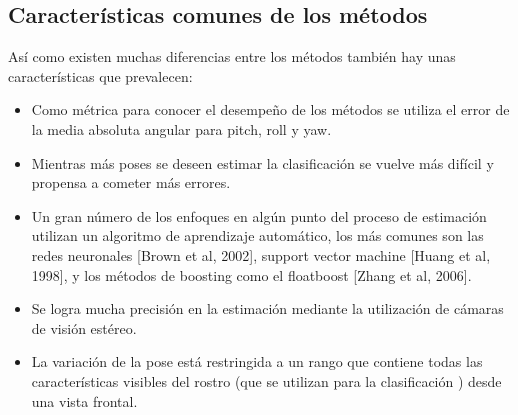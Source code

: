    \subsection{Características comunes de los métodos}
   Así como existen muchas diferencias entre los métodos también hay unas características que prevalecen:
   \begin{itemize}
   	\item Como métrica para conocer el desempeño de los métodos se utiliza el error de la media absoluta angular para pitch, roll y yaw.
   	\item Mientras más poses se deseen estimar la clasificación se vuelve más difícil y propensa a cometer más errores.
   	\item Un gran número de los enfoques en algún punto del proceso de estimación utilizan un algoritmo de aprendizaje automático, los más comunes son las redes neuronales [Brown et al, 2002], support vector machine [Huang et al, 1998], y los métodos de boosting como el floatboost [Zhang et al, 2006].
   	\item Se logra mucha precisión en la estimación mediante la utilización de cámaras de visión estéreo.
   	\item La variación de la pose está restringida a un rango que contiene todas las características visibles del rostro (que se utilizan para la clasificación ) desde una vista frontal.
   \end{itemize}